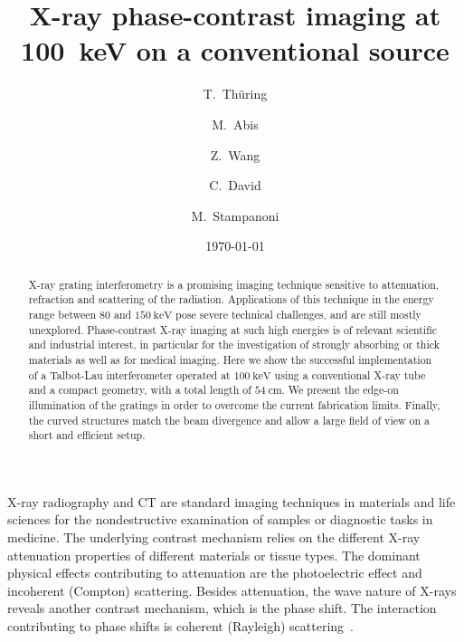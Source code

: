 \documentclass[english]{nature}
\begin{document}
\title{X-ray phase-contrast imaging at \SI{100}{\kilo\electronvolt} on
a conventional source}

\author[1,2]{T.~Thüring}
\author[1,2]{M.~Abis}
\author[1]{Z.~Wang}
\author[1]{C.~David}
\author[1,2]{M.~Stampanoni}

\date{\today}


\maketitle


\begin{abstract}
    X-ray grating interferometry is a promising imaging technique sensitive
    to attenuation, refraction and scattering of the radiation. Applications
    of this technique in the energy range between $\num{80}$ and
    $\SI{150}{\kilo\electronvolt}$ pose severe technical challenges, and are
    still mostly unexplored. Phase-contrast X-ray imaging at such high
    energies is of relevant scientific and industrial interest, in
    particular for the investigation of strongly absorbing or thick materials 
    as well as for medical imaging. Here we show the successful
    implementation of a Talbot-Lau interferometer operated at
    $\SI{100}{\kilo\electronvolt}$ using a conventional X-ray tube and a
    compact geometry, with a total length of $\SI{54}{\centi\metre}$. We
    present the edge-on illumination of the gratings in order to overcome
    the current fabrication limits. Finally, the curved structures match
    the beam divergence and allow a large field of view on a short and
    efficient setup.
\end{abstract}

X-ray radiography and \ac{CT} are standard imaging techniques in
materials and life sciences for the nondestructive examination of samples or
diagnostic tasks in medicine. The underlying contrast mechanism
relies on the different X-ray attenuation properties of different materials
or tissue types. The dominant physical effects contributing to attenuation
are the photoelectric effect and incoherent (Compton) scattering. Besides attenuation, the wave
nature of X-rays reveals another contrast mechanism, which is the phase
shift. The interaction contributing to phase shifts is coherent (Rayleigh)
scattering~\cite{Als-Nielsen2011}.
\end{document}

